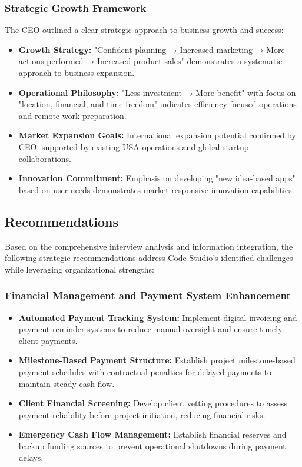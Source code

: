 \documentclass[12pt,a4paper]{article}
\begin{document}
\subsubsection{Strategic Growth Framework}

The CEO outlined a clear strategic approach to business growth and success:

\begin{itemize}
    \item \textbf{Growth Strategy:} "Confident planning → Increased marketing → More actions performed → Increased product sales" demonstrates a systematic approach to business expansion.
    
    \item \textbf{Operational Philosophy:} "Less investment → More benefit" with focus on "location, financial, and time freedom" indicates efficiency-focused operations and remote work preparation.
    
    \item \textbf{Market Expansion Goals:} International expansion potential confirmed by CEO, supported by existing USA operations and global startup collaborations.
    
    \item \textbf{Innovation Commitment:} Emphasis on developing "new idea-based apps" based on user needs demonstrates market-responsive innovation capabilities.
\end{itemize}

\subsection{Recommendations}

Based on the comprehensive interview analysis and information integration, the following strategic recommendations address Code Studio's identified challenges while leveraging organizational strengths:

\subsubsection{Financial Management and Payment System Enhancement}

\begin{itemize}
    \item \textbf{Automated Payment Tracking System:} Implement digital invoicing and payment reminder systems to reduce manual oversight and ensure timely client payments.
    
    \item \textbf{Milestone-Based Payment Structure:} Establish project milestone-based payment schedules with contractual penalties for delayed payments to maintain steady cash flow.
    
    \item \textbf{Client Financial Screening:} Develop client vetting procedures to assess payment reliability before project initiation, reducing financial risks.
    
    \item \textbf{Emergency Cash Flow Management:} Establish financial reserves and backup funding sources to prevent operational shutdowns during payment delays.
\end{itemize}
\end{document}
